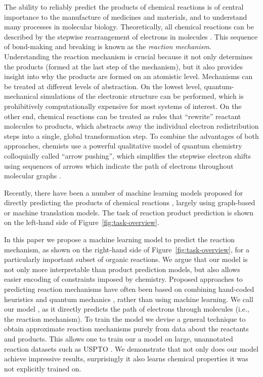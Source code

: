 
The ability to reliably predict the products of chemical reactions is of central importance to the manufacture of medicines and materials, and to understand many processes in molecular biology.
Theoretically, all chemical reactions can be described by the stepwise rearrangement of electrons in molecules \citep{herges1994organizing}. 
This sequence of bond-making and breaking is known as the \emph{reaction mechanism}. 
Understanding the reaction mechanism is crucial because it not only determines the products (formed at the last step of the mechanism), 
but it also provides insight into why the products are formed on an atomistic level. 
%
Mechanisms can be treated at different levels of abstraction. 
On the lowest level, quantum-mechanical simulations of the electronic structure can be performed, which is prohibitively computationally expensive for most systems of interest. 
On the other end, chemical reactions can be treated as rules that ``rewrite'' reactant molecules to products, which abstracts away the individual electron redistribution steps into a single, global transformation step. 
To combine the advantages of both approaches, chemists use a powerful qualitative model of quantum chemistry colloquially called ``arrow pushing'', which simplifies the stepwise electron shifts using sequences of arrows which indicate the path of electrons throughout molecular graphs \citep{herges1994organizing}. 

Recently, there have been a number of machine learning models proposed for directly predicting the products of chemical reactions \citep{coley2017prediction,jin2017predicting,schwaller2017found,neural-symbolic,segler2018planning,wei2016neural}, largely using graph-based or machine translation models. 
The task of reaction product prediction is shown on the left-hand side of Figure~\ref{fig:task-overview}. 

In this paper we propose a machine learning model to predict the reaction mechanism, as shown on the right-hand side of Figure~\ref{fig:task-overview}, for a particularly important subset of organic reactions.
We argue that our model is not only more interpretable than product prediction models, but also allows easier encoding of constraints imposed by chemistry.
Proposed approaches to predicting reaction mechanisms have often been based on combining hand-coded heuristics and quantum mechanics \citep{bergeler2015heuristics,kim2018efficient,nandi2017tabu,rappoport2014complex,simm2017context,zimmerman2013automated}, 
rather than using machine learning.
We call our model \ourModel, as it directly predicts the path of electrons through molecules (i.e., the reaction mechanism). 
To train the model we devise a general technique to obtain approximate reaction mechanisms purely from data about the reactants and products. 
This allows one to train our a model on large, unannotated reaction datasets such as USPTO \citep{lowe2012extraction}. We demonstrate that not only does our model achieve impressive results, surprisingly it also learns chemical properties it was not explicitly trained on.



